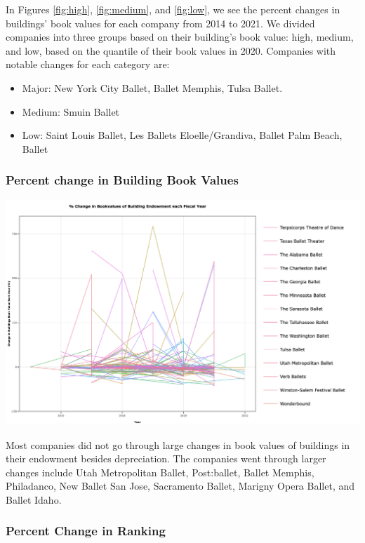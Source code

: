 \documentclass[Dance Data
Project,article,submit,moreauthors,pdftex]{mdpi}
\providecommand{\tightlist}{%
  \setlength{\itemsep}{0pt}\setlength{\parskip}{0pt}}
\begin{document}
In Figures \ref{fig:high}, \ref{fig:medium}, and \ref{fig:low}, we see
the percent changes in buildings' book values for each company from 2014
to 2021. We divided companies into three groups based on their
building's book value: high, medium, and low, based on the quantile of
their book values in 2020. Companies with notable changes for each
category are:

\begin{itemize}
\tightlist
\item
  Major: New York City Ballet, Ballet Memphis, Tulsa Ballet.\\
\item
  Medium: Smuin Ballet\\
\item
  Low: Saint Louis Ballet, Les Ballets Eloelle/Grandiva, Ballet Palm
  Beach, Ballet
\end{itemize}

\hypertarget{percent-change-in-building-book-values}{%
\subsubsection{Percent change in Building Book
Values}\label{percent-change-in-building-book-values}}

\includegraphics[width=0.9\linewidth,]{../images/percentage_building}

Most companies did not go through large changes in book values of
buildings in their endowment besides depreciation. The companies went
through larger changes include Utah Metropolitan Ballet, Post:ballet,
Ballet Memphis, Philadanco, New Ballet San Jose, Sacramento Ballet,
Marigny Opera Ballet, and Ballet Idaho.

\hypertarget{percent-change-in-ranking}{%
\subsubsection{Percent Change in
Ranking}\label{percent-change-in-ranking}}
\end{document}
